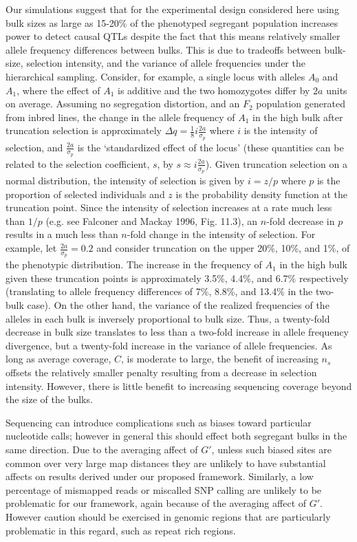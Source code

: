 Our simulations suggest that for the experimental design considered here using bulk sizes as large as 15-20\% of the phenotyped segregant population increases power to detect causal QTLs despite the fact that this means relatively smaller allele frequency differences between bulks. This is due to tradeoffs between bulk-size, selection intensity, and the variance of allele frequencies under the hierarchical sampling.  Consider, for example, a single locus with alleles $A_0$ and $A_1$, where the effect of $A_1$ is additive and the two homozygotes differ by $2a$ units on average. Assuming no segregation distortion, and an $F_2$ population generated from inbred lines, the change in the allele frequency of $A_1$ in the high bulk after truncation selection is approximately $\Delta q = \frac{1}{8}i\frac{2a}{\sigma_p}$ where $i$ is the intensity of selection, and $\frac{2a}{\sigma_p}$ is the `standardized effect of the locus'  (these quantities can be related to the selection coefficient, $s$, by $s \approx i\frac{2a}{\sigma_p}$). Given truncation selection on a normal distribution, the intensity of selection is given by $i=z/p$ where $p$ is the proportion of selected individuals and $z$ is the probability density function at the truncation point. Since the intensity of selection increases at a rate much less than $1/p$ (e.g. see Falconer and Mackay 1996, Fig. 11.3), an $n$-fold decrease in  $p$ results in a much less than $n$-fold change in the intensity of selection. For example, let $\frac{2a}{\sigma_p}=0.2$ and consider truncation on the upper 20\%, 10\%, and 1\%, of the phenotypic distribution. The increase in the frequency of $A_1$ in the high bulk given these truncation points is approximately 3.5\%, 4.4\%, and 6.7\% respectively (translating to allele frequency differences of 7\%, 8.8\%, and 13.4\% in the two-bulk case). On the other hand, the variance of the realized frequencies of the alleles in each bulk is inversely proportional to bulk size. Thus, a twenty-fold decrease in bulk size translates to less than a two-fold increase in allele frequency divergence, but a twenty-fold increase in the variance of allele frequencies. As long as average coverage, $C$, is moderate to large, the benefit of increasing $n_s$ offsets the relatively smaller penalty resulting from a decrease in selection intensity. However, there is little benefit to increasing sequencing coverage beyond the size of the bulks.  

Sequencing can introduce complications such as biases toward particular nucleotide calls; however in general this should effect both segregant bulks in the same direction.  Due to the averaging affect of $G'$, unless such biased sites are common over very large map distances they are unlikely to have substantial affects on results derived under our proposed framework.  Similarly, a low percentage of mismapped reads or miscalled SNP calling are unlikely to be problematic for our framework, again because of the averaging affect of $G'$. However caution should be exercised in genomic regions that are particularly problematic in this regard, such as repeat rich regions.

